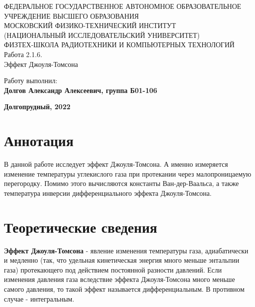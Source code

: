 \documentclass[15pt,a5paper,reqno]{article}
\begin{document}
\begin{center}
  {\small ФЕДЕРАЛЬНОЕ ГОСУДАРСТВЕННОЕ АВТОНОМНОЕ ОБРАЗОВАТЕЛЬНОЕ\\ УЧРЕЖДЕНИЕ ВЫСШЕГО ОБРАЗОВАНИЯ\\ МОСКОВСКИЙ ФИЗИКО-ТЕХНИЧЕСКИЙ ИНСТИТУТ\\ (НАЦИОНАЛЬНЫЙ ИССЛЕДОВАТЕЛЬСКИЙ УНИВЕРСИТЕТ)\\ ФИЗТЕХ-ШКОЛА РАДИОТЕХНИКИ И КОМПЬЮТЕРНЫХ ТЕХНОЛОГИЙ}\\
  \hfill \break
  \hfill \break
  \hfill \break
  \Huge{Работа 2.1.6. \\ Эффект Джоуля-Томсона}\\
\end{center}

\hfill \break
\hfill \break
\hfill \break
\hfill \break
\hfill \break
\hfill \break

\begin{flushright}
  \normalsize{Работу выполнил:}\\
  \normalsize{\textbf{Долгов Александр Алексеевич, группа Б01-106}}\\
\end{flushright}

\begin{center}
  \normalsize{\textbf{Долгопрудный, 2022}}
\end{center}

\thispagestyle{empty} %


\newpage
\thispagestyle{plain}
\tableofcontents
\thispagestyle{plain}
\newpage

\section{Аннотация}

    В данной работе исследует эффект Джоуля-Томсона. А именно измеряется изменение температуры углекислого газа при протекании через малопроницаемую перегородку. Помимо этого вычисляются константы Ван-дер-Ваальса, а также температура инверсии дифференциального эффекта Джоуля-Томсона.
    
\section{Теоретические сведения}

    \textbf{Эффект Джоуля-Томсона} - явление изменения температуры газа, адиабатически и медленно (так, что удельная кинетическая энергия много меньше энтальпии газа) протекающего под действием постоянной разности давлений. Если изменения давления газа вследствие эффекта Джоуля-Томсона много меньше самого давления, то такой эффект называется дифференциальным. В противном случае - интегральным.
    
\end{document}
